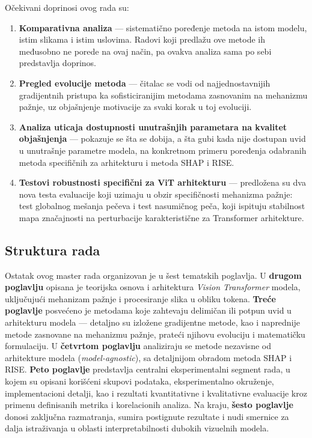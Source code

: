 Očekivani doprinosi ovog rada su:
\begin{enumerate}
    \item \textbf{Komparativna analiza} — sistematično poređenje metoda na istom modelu, 
    istim slikama i istim uslovima. Radovi koji predlažu ove metode ih međusobno ne porede 
    na ovaj način, pa ovakva analiza sama po sebi predstavlja doprinos.
    
    \item \textbf{Pregled evolucije metoda} — čitalac se vodi od najjednostavnijih gradijentnih 
    pristupa ka sofisticiranijim metodama zasnovanim na mehanizmu pažnje, uz objašnjenje 
    motivacije za svaki korak u toj evoluciji.
    
    \item \textbf{Analiza uticaja dostupnosti unutrašnjih parametara na kvalitet objašnjenja} — pokazuje se šta se dobija, a šta gubi kada nije dostupan uvid u unutrašnje parametre modela, na konkretnom primeru poređenja odabranih metoda specifičnih za arhitekturu i metoda SHAP i RISE.

    \item \textbf{Testovi robustnosti specifični za ViT arhitekturu} — predložena su dva nova testa evaluacije koji uzimaju u obzir specifičnosti mehanizma pažnje: test globalnog mešanja pečeva i test nasumičnog peča, koji ispituju stabilnost mapa značajnosti na perturbacije karakteristične za Transformer arhitekture.

\end{enumerate}

\subsection{Struktura rada}

Ostatak ovog master rada organizovan je u šest tematskih poglavlja. U \textbf{drugom poglavlju} opisana je teorijska osnova i arhitektura \textit{Vision Transformer} modela, uključujući mehanizam pažnje i procesiranje slika u obliku tokena. \textbf{Treće poglavlje} posvećeno je metodama koje zahtevaju delimičan ili potpun uvid u arhitekturu modela — detaljno su izložene gradijentne metode, kao i naprednije metode zasnovane na mehanizmu pažnje, prateći njihovu evoluciju i matematičku formulaciju. U \textbf{četvrtom poglavlju} analiziraju se metode nezavisne od arhitekture modela (\textit{model-agnostic}), sa detaljnijom obradom metoda SHAP i RISE. \textbf{Peto poglavlje} predstavlja centralni eksperimentalni segment rada, u kojem su opisani korišćeni skupovi podataka, eksperimentalno okruženje, implementacioni detalji, kao i rezultati kvantitativne i kvalitativne evaluacije kroz primenu definisanih metrika i korelacionih analiza. Na kraju, \textbf{šesto poglavlje} donosi zaključna razmatranja, sumira postignute rezultate i nudi smernice za dalja istraživanja u oblasti interpretabilnosti dubokih vizuelnih modela.